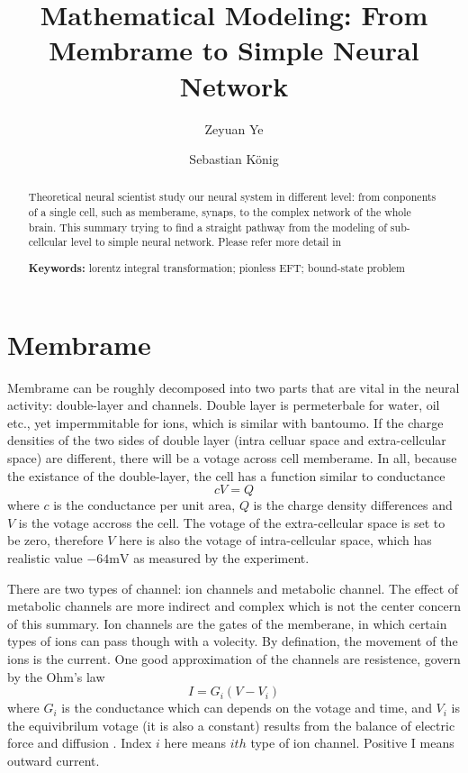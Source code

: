 \documentclass[11pt]{article}
\date{}
\title{Mathematical Modeling: From Membrame to Simple Neural Network}
\author[1]{Zeyuan Ye}
\author[2]{Sebastian K{\"o}nig}
\begin{document}
  \maketitle

\begin{abstract}

  Theoretical neural scientist study our neural system in different level: from
  conponents of a single cell, such as memberame, synaps, to the complex network
  of the whole brain. This summary trying to find a straight pathway from the
  modeling of sub-cellcular level to simple neural network. Please refer more detail
  in \cite{}

\noindent \textbf{Keywords:} lorentz integral transformation; pionless EFT;
  bound-state problem\\ %
\end{abstract}

\section{Membrame}
Membrame can be roughly decomposed into two parts that are vital in the neural
activity: double-layer and channels. Double layer is permeterbale for water, oil
etc., yet impermmitable for ions, which is similar with bantoumo. If the charge
densities of the two sides of double layer (intra celluar space and
extra-cellcular space) are different, there will be a votage across cell
memberame. In all, because the existance of the double-layer, the cell has a
function similar to conductance
\begin{equation}
  c V = Q
  \label{capt}
\end{equation}
where $c$ is the conductance per unit area, $Q$ is the charge density
differences and $V$ is the votage accross the cell. The votage of the
extra-cellcular space is set to be zero, therefore $V$ here is also the votage
of intra-cellcular space, which has realistic value $-64 \text{mV}$ as measured
by the experiment.

There are two types of channel: ion channels and metabolic channel. The effect
of metabolic channels are more indirect and complex which is not the center
concern of this summary. Ion channels are the gates of the memberane, in which
certain types of ions can pass though
with a volecity. By defination, the movement of the ions is the current. One
good approximation of the channels are resistence, govern by the Ohm's law
\begin{equation}
  I = G_i (V - V_i)
  \label{olm}
\end{equation}
where $G_i$ is the conductance which can depends on the votage and time, and
$V_i$ is the equivibrilum votage (it is also a constant) results from
the balance of electric force and diffusion \cite{}. Index $i$ here means
$ith$ type of ion channel. Positive I means outward current.
\end{document}
